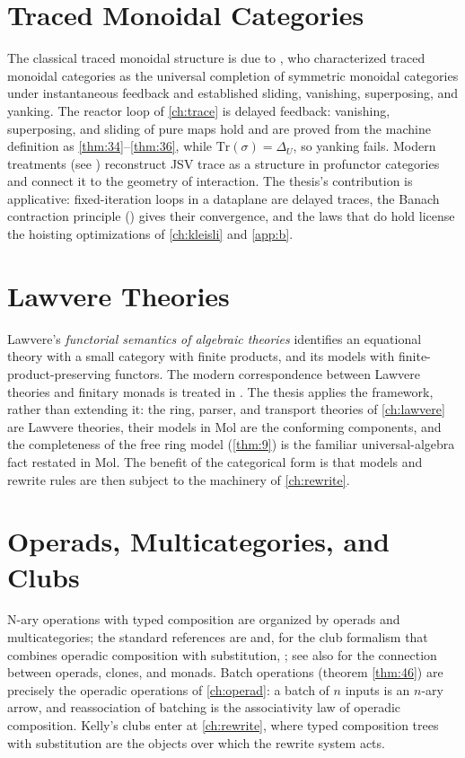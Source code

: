 \section{Traced Monoidal Categories}
The classical traced monoidal structure is due to \cite{joyalsv}, who characterized traced monoidal categories as the universal completion of symmetric monoidal categories under instantaneous feedback and established sliding, vanishing, superposing, and yanking. The reactor loop of \autoref{ch:trace} is delayed feedback: vanishing, superposing, and sliding of pure maps hold and are proved from the machine definition as \ref{thm:34}--\ref{thm:36}, while $\mathrm{Tr} (\sigma) = \Delta_U$, so yanking fails. Modern treatments (see \cite{arxiv-traced-monoidal}) reconstruct JSV trace as a structure in profunctor categories and connect it to the geometry of interaction. The thesis's contribution is applicative: fixed-iteration loops in a dataplane are delayed traces, the Banach contraction principle (\cite{banach}) gives their convergence, and the laws that do hold license the hoisting optimizations of \autoref{ch:kleisli} and \autoref{app:b}.

\section{Lawvere Theories}
Lawvere's \emph{functorial semantics of algebraic theories} \cite{lawvere} identifies an equational theory with a small category with finite products, and its models with finite-product-preserving functors. The modern correspondence between Lawvere theories and finitary monads is treated in \cite{arxiv-lawvere}. The thesis applies the framework, rather than extending it: the ring, parser, and transport theories of \autoref{ch:lawvere} are Lawvere theories, their models in Mol are the conforming components, and the completeness of the free ring model (\ref{thm:9}) is the familiar universal-algebra fact restated in Mol. The benefit of the categorical form is that models and rewrite rules are then subject to the machinery of \autoref{ch:rewrite}.

\section{Operads, Multicategories, and Clubs}
N-ary operations with typed composition are organized by operads and multicategories; the standard references are \cite{leinster} and, for the club formalism that combines operadic composition with substitution, \cite{kelly}; see also \cite{arxiv-operads} for the connection between operads, clones, and monads. Batch operations (theorem \ref{thm:46}) are precisely the operadic operations of \autoref{ch:operad}: a batch of $n$ inputs is an $n$-ary arrow, and reassociation of batching is the associativity law of operadic composition. Kelly's clubs enter at \autoref{ch:rewrite}, where typed composition trees with substitution are the objects over which the rewrite system acts.

